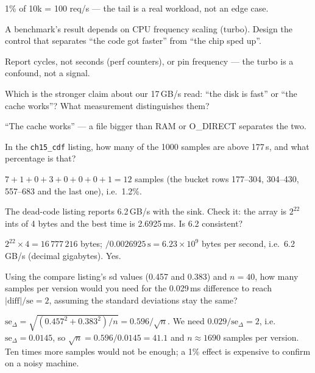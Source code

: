 \begin{solution}[hint]
1\% of 10k = 100 req/s --- the tail is a real workload, not an
edge case.
\end{solution}
\begin{exercise}[hard]
A benchmark's result depends on CPU frequency scaling (turbo).
Design the control that separates ``the code got faster'' from
``the chip sped up''.
\end{exercise}
\begin{solution}[hint]
Report cycles, not seconds (perf counters), or pin frequency ---
the turbo is a confound, not a signal.
\end{solution}
\begin{exercise}[medium]
Which is the stronger claim about our 17\,GB/s read: ``the disk is
fast'' or ``the cache works''? What measurement distinguishes them?
\end{exercise}
\begin{solution}[hint]
``The cache works'' --- a file bigger than RAM or O\_DIRECT
separates the two.
\end{solution}

\begin{exercise}[easy]
In the \texttt{ch15\_cdf} listing, how many of the 1000 samples are
above 177\,\textmu s, and what percentage is that?
\end{exercise}
\begin{solution}[hint]
$7+1+0+3+0+0+0+1=12$ samples (the bucket rows 177--304, 304--430,
557--683 and the last one), i.e.\ 1.2\%.
\end{solution}

\begin{exercise}[medium]
The dead-code listing reports 6.2\,GB/s with the sink. Check it:
the array is $2^{22}$ ints of 4 bytes and the best time is
2.6925\,ms. Is 6.2 consistent?
\end{exercise}
\begin{solution}[hint]
$2^{22}\times4=16\,777\,216$ bytes; $/0.0026925\,\text{s}=6.23\times10^9$
bytes per second, i.e.\ 6.2\,GB/s (decimal gigabytes). Yes.
\end{solution}

\begin{exercise}[medium]
Using the compare listing's sd values (0.457 and 0.383) and $n=40$,
how many samples per version would you need for the 0.029\,ms
difference to reach $|\text{diff}|/\text{se}=2$, assuming the standard
deviations stay the same?
\end{exercise}
\begin{solution}[hint]
$\mathrm{se}_\Delta=\sqrt{(0.457^2+0.383^2)/n}=0.596/\sqrt n$. We need
$0.029/\mathrm{se}_\Delta=2$, i.e.\ $\mathrm{se}_\Delta=0.0145$, so
$\sqrt n=0.596/0.0145=41.1$ and $n\approx1690$ samples per version.
Ten times more samples would not be enough; a 1\% effect is
expensive to confirm on a noisy machine.
\end{solution}
